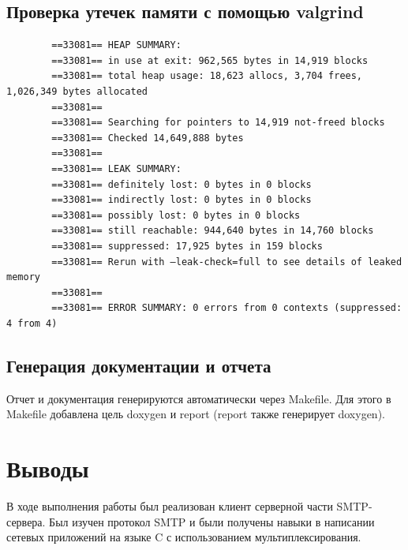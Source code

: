 \documentclass[a4paper,12pt]{report}
\begin{document}
\section{Проверка утечек памяти с помощью valgrind}
    \begin{verbatim}
        ==33081== HEAP SUMMARY:
        ==33081== in use at exit: 962,565 bytes in 14,919 blocks
        ==33081== total heap usage: 18,623 allocs, 3,704 frees, 1,026,349 bytes allocated
        ==33081==
        ==33081== Searching for pointers to 14,919 not-freed blocks
        ==33081== Checked 14,649,888 bytes
        ==33081==
        ==33081== LEAK SUMMARY:
        ==33081== definitely lost: 0 bytes in 0 blocks
        ==33081== indirectly lost: 0 bytes in 0 blocks
        ==33081== possibly lost: 0 bytes in 0 blocks
        ==33081== still reachable: 944,640 bytes in 14,760 blocks
        ==33081== suppressed: 17,925 bytes in 159 blocks
        ==33081== Rerun with —leak-check=full to see details of leaked memory
        ==33081==
        ==33081== ERROR SUMMARY: 0 errors from 0 contexts (suppressed: 4 from 4)
    \end{verbatim}

\section{Генерация документации и отчета}
Отчет и документация генерируются автоматически через Makefile.
Для этого в Makefile добавлена цель doxygen и report (report также генерирует doxygen).

\chapter*{Выводы}

В ходе выполнения работы был реализован клиент серверной части SMTP-сервера.
Был изучен протокол SMTP и были получены навыки в написании сетевых приложений на языке C с использованием мультиплексирования.
\end{document}
